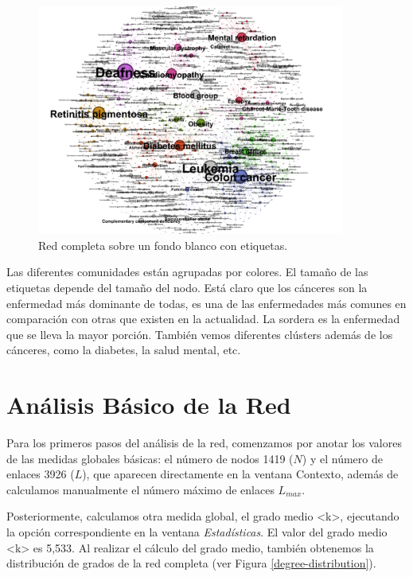 \documentclass{uimppracticas}
\begin{document}
\begin{figure}[h]
	\centering
	\includegraphics[width=0.9\textwidth]{images/completa_FR_labels}
	\caption{Red completa sobre un fondo blanco con etiquetas.}
	\label{completa_FR_labels}
\end{figure}

Las diferentes comunidades están agrupadas por colores. El tamaño de las etiquetas depende del tamaño del nodo. Está claro que los cánceres son la enfermedad más dominante de todas, es una de las enfermedades más comunes en comparación con otras que existen en la actualidad. La sordera es la enfermedad que se lleva la mayor porción. También vemos diferentes clústers además de los cánceres, como la diabetes, la salud mental, etc. 

\section*{Análisis Básico de la Red}

Para los primeros pasos del análisis de la red, comenzamos por anotar los valores de las medidas globales básicas: el número de nodos 1419 ($N$) y el número de enlaces 3926 ($L$), que aparecen directamente en la ventana Contexto, además de calculamos manualmente el número máximo de enlaces $L_{max}$. 

Posteriormente, calculamos otra medida global, el grado medio <k>, ejecutando la opción correspondiente en la ventana \textit{Estadísticas}. El valor del grado medio <k> es 5,533. Al realizar el cálculo del grado medio, también obtenemos la distribución de grados de la red completa (ver Figura \ref{degree-distribution}).
\end{document}
